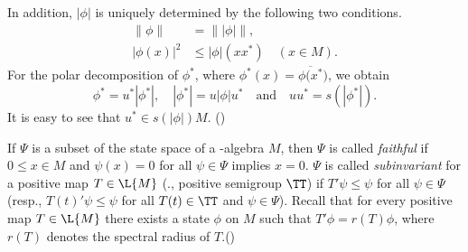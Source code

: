 In addition, $|\phi|$ is uniquely determined by the following two conditions.
\begin{align*}
	\|\phi\| &= \| |\phi| \|, \\
	|\phi(x)|^{2} &\leq |\phi|(xx^{*}) \quad (x\in M).
\end{align*}
For the polar decomposition of $\phi^{*}$, where $\phi^{*}(x) = \overline{\phi(x^{*}})$, we obtain
\[
	\phi^{*} = u^{*}|\phi^{*}|, 
	\quad |\phi^{*}| = u|\phi|u^{*} \quad 
	\text{and} \quad uu^{*} = s(|\phi^{*}|).
\]
It is easy to see that $u^{*} \in s(|\phi|)M $.
(\citet[Theorem III.4.2 \& Proposition III.4.6]{takesaki:1979})

If $\Psi$ is a subset of the state space of a \CA-algebra $M$, then $\Psi$ is called \emph{faithful} if $0 \leq x\in M$ and $\psi(x) = 0$ for all $\psi\in\Psi$ implies $x = 0$.
$\Psi$ is called \emph{subinvariant} for a positive map $T\in\L{M}$ (\resp., positive semigroup $\TT$) if $T'\psi \leq \psi$ for all $\psi\in\Psi$ (resp., $T(t)'\psi \leq \psi$ for all $T(t)\in \TT$ and $\psi\in\Psi$).
Recall that for every positive map $T \in \L{M}$ there exists a state $\phi$ on $M$ such that $T'\phi = r(T)\phi$, where $r(T)$ denotes the spectral radius of $T$.(\citet[Theorem 2.1]{groh:1981}) %

